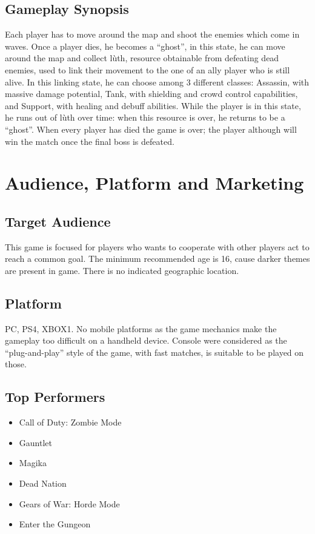 \documentclass[12pt]{article}
\begin{document}
\subsection{Gameplay Synopsis}

Each player has to move around the map and shoot the enemies which come in waves. Once a player dies, he becomes a “ghost”, in this state, he can move around the map and collect lùth, resource obtainable from defeating dead enemies, used to link their movement to the one of an ally player who is still alive. In this linking state, he can choose among 3 different classes: Assassin, with massive damage potential, Tank, with shielding and crowd control capabilities, and Support, with healing and debuff abilities. While the player is in this state, he runs out of lùth over time: when this resource is over, he returns to be a “ghost”. When every player has died the game is over; the player although will win the match once the final boss is defeated.

\newpage

\section{Audience, Platform and Marketing}

\subsection{Target Audience}

This game is focused for players who wants to cooperate with other players act to reach a common goal. The minimum recommended age is 16, cause darker themes are present in game. There is no indicated geographic location.

\subsection{Platform}

PC, PS4, XBOX1. No mobile platforms as the game mechanics make the gameplay too difficult on a handheld device. Console were considered as the “plug-and-play” style of the game, with fast matches, is suitable to be played on those.

\subsection{Top Performers}

\begin{itemize}
	\item Call of Duty: Zombie Mode
	\item Gauntlet
	\item Magika
	\item Dead Nation
	\item Gears of War: Horde Mode
	\item Enter the Gungeon
\end{itemize}
\end{document}
